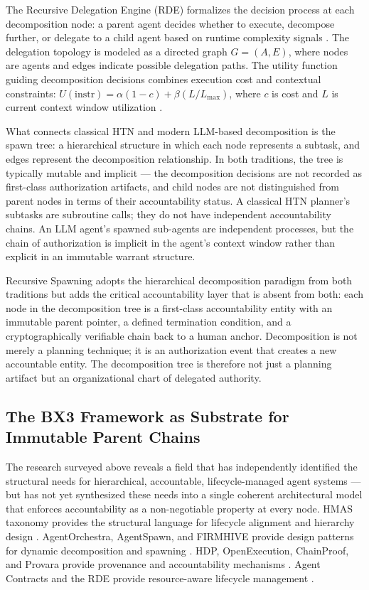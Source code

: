 The Recursive Delegation Engine (RDE) formalizes the decision process at each decomposition node: a parent agent decides whether to execute, decompose further, or delegate to a child agent based on runtime complexity signals \cite{rde2025}. The delegation topology is modeled as a directed graph $G = (A, E)$, where nodes are agents and edges indicate possible delegation paths. The utility function guiding decomposition decisions combines execution cost and contextual constraints: $U(\text{instr}) = \alpha(1 - c) + \beta (L / L_{\max})$, where $c$ is cost and $L$ is current context window utilization \cite{rde2025}.

What connects classical HTN and modern LLM-based decomposition is the spawn tree: a hierarchical structure in which each node represents a subtask, and edges represent the decomposition relationship. In both traditions, the tree is typically mutable and implicit — the decomposition decisions are not recorded as first-class authorization artifacts, and child nodes are not distinguished from parent nodes in terms of their accountability status. A classical HTN planner's subtasks are subroutine calls; they do not have independent accountability chains. An LLM agent's spawned sub-agents are independent processes, but the chain of authorization is implicit in the agent's context window rather than explicit in an immutable warrant structure.

Recursive Spawning adopts the hierarchical decomposition paradigm from both traditions but adds the critical accountability layer that is absent from both: each node in the decomposition tree is a first-class accountability entity with an immutable parent pointer, a defined termination condition, and a cryptographically verifiable chain back to a human anchor. Decomposition is not merely a planning technique; it is an authorization event that creates a new accountable entity. The decomposition tree is therefore not just a planning artifact but an organizational chart of delegated authority.

\subsection{The BX3 Framework as Substrate for Immutable Parent Chains}

The research surveyed above reveals a field that has independently identified the structural needs for hierarchical, accountable, lifecycle-managed agent systems — but has not yet synthesized these needs into a single coherent architectural model that enforces accountability as a non-negotiable property at every node. HMAS taxonomy provides the structural language for lifecycle alignment and hierarchy design \cite{moore2025hmas}. AgentOrchestra, AgentSpawn, and FIRMHIVE provide design patterns for dynamic decomposition and spawning \cite{agentorchestra2025, agentspawn2025, firmhive2025}. HDP, OpenExecution, ChainProof, and Provara provide provenance and accountability mechanisms \cite{hdp2026, hdp2025ietf, openexecution2025, chainproof2025, provara2025}. Agent Contracts and the RDE provide resource-aware lifecycle management \cite{agentcontracts2025, rde2025}.


